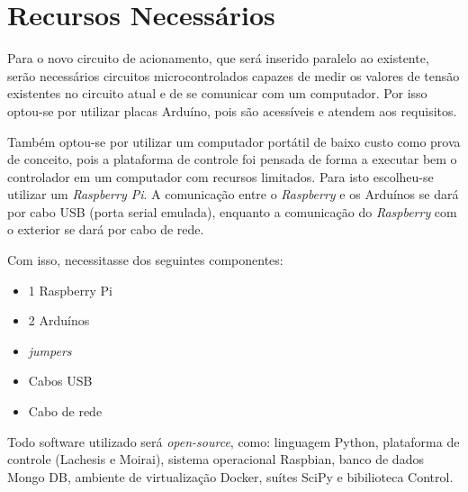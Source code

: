 
\chapter{Recursos Necessários}%
\label{sec:needed-resources}

Para o novo circuito de acionamento, que será inserido paralelo ao existente,
serão necessários circuitos microcontrolados capazes de medir os valores de
tensão existentes no circuito atual e de se comunicar com um computador. Por
isso optou-se por utilizar placas Arduíno, pois são acessíveis e atendem aos
requisitos.

Também optou-se por utilizar um computador portátil de baixo custo como prova de
conceito, pois a plataforma de controle foi pensada de forma a executar bem o
controlador em um computador com recursos limitados. Para isto escolheu-se
utilizar um \textit{Raspberry Pi}. A comunicação entre o \textit{Raspberry} e os
Arduínos se dará por cabo USB (porta serial emulada), enquanto a comunicação do
\textit{Raspberry} com o exterior se dará por cabo de rede.

Com isso, necessitasse dos seguintes componentes:

\begin{itemize}
      \item 1 Raspberry Pi
      \item 2 Arduínos
      \item \textit{jumpers}
      \item Cabos USB
      \item Cabo de rede
\end{itemize}

Todo software utilizado será \textit{open-source}, como: linguagem Python,
plataforma de controle (Lachesis e Moirai), sistema operacional Raspbian, banco
de dados Mongo DB, ambiente de virtualização Docker, suítes SciPy e bibilioteca
Control.
